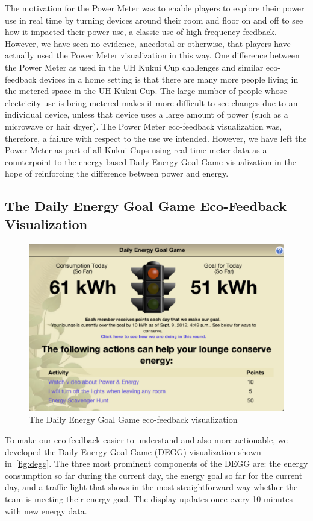 \documentclass{sigchi}
\begin{document}
The motivation for the Power Meter was to enable players to explore their power use in real time by turning devices around their room and floor on and off to see how it impacted their power use, a classic use of high-frequency feedback. However, we have seen no evidence, anecdotal or otherwise, that players have actually used the Power Meter visualization in this way. One difference between the Power Meter as used in the UH Kukui Cup challenges and similar eco-feedback devices in a home setting is that there are many more people living in the metered space in the UH Kukui Cup. The large number of people whose electricity use is being metered makes it more difficult to see changes due to an individual device, unless that device uses a large amount of power (such as a microwave or hair dryer). The Power Meter eco-feedback visualization was, therefore, a failure with respect to the use we intended. However, we have left the Power Meter as part of all Kukui Cups using real-time meter data as a counterpoint to the energy-based Daily Energy Goal Game visualization in the hope of reinforcing the difference between power and energy.

\subsection{The Daily Energy Goal Game Eco-Feedback Visualization}

\begin{figure}[!tb]
	\centering
	\includegraphics[width=0.95\columnwidth]{degg.eps}
	\caption{The Daily Energy Goal Game eco-feedback visualization}
	\label{fig:degg}
\end{figure}

To make our eco-feedback easier to understand and also more actionable, we developed the Daily Energy Goal Game (DEGG) visualization shown in~\autoref{fig:degg}. The three most prominent components of the DEGG are: the energy consumption so far during the current day, the energy goal so far for the current day, and a traffic light that shows in the most straightforward way whether the team is meeting their energy goal. The display updates once every 10 minutes with new energy data.
\end{document}
